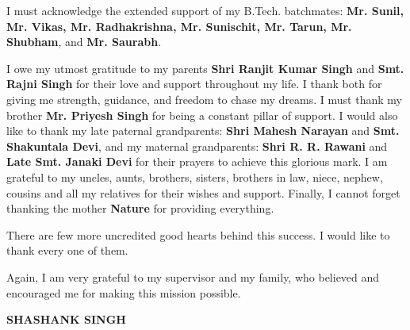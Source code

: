 I must acknowledge the extended support of my B.Tech. batchmates: \textbf{Mr. Sunil, Mr. Vikas, Mr. Radhakrishna, Mr. Sunischit, Mr. Tarun, Mr. Shubham}, and \textbf{Mr. Saurabh}.

I owe my utmost gratitude to my parents \textbf{Shri Ranjit Kumar Singh} and \textbf{Smt. Rajni Singh} for their love and support throughout my life. I thank both for giving me strength, guidance, and freedom to chase my dreams. I must thank my brother \textbf{Mr. Priyesh Singh} for being a constant pillar of support. I would also like to thank my late paternal grandparents: \textbf{Shri Mahesh Narayan} and \textbf{Smt. Shakuntala Devi}, and my maternal grandparents: \textbf{Shri R. R. Rawani} and \textbf{Late Smt. Janaki Devi} for their prayers to achieve this glorious mark. I am grateful to my uncles, aunts, brothers, sisters, brothers in law, niece, nephew, cousins and all my relatives for their wishes and support. Finally, I cannot forget thanking the mother \textbf{Nature} for providing everything.

There are few more uncredited good hearts behind this success. I would like to thank every one of them.

Again, I am very grateful to my supervisor and my family, who believed and encouraged me for making this mission possible.

\vspace{0.25in}
\begin{flushright}
\textbf{SHASHANK SINGH}
\end{flushright}

\newpage